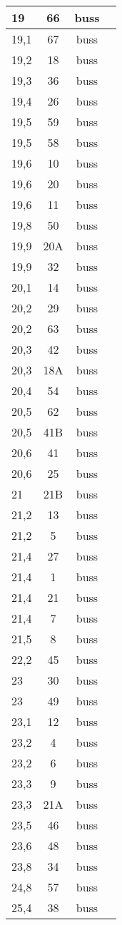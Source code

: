 \begin{longtable}{|l|c|c|c|}
19	&	66	&	buss	\\ \hline
19,1	&	67	&	buss	\\ \hline
19,2	&	18	&	buss	\\ \hline
19,3	&	36	&	buss	\\ \hline
19,4	&	26	&	buss	\\ \hline
19,5	&	59	&	buss	\\ \hline
19,5	&	58	&	buss	\\ \hline
19,6	&	10	&	buss	\\ \hline
19,6	&	20	&	buss	\\ \hline
19,6	&	11	&	buss	\\ \hline
19,8	&	50	&	buss	\\ \hline
19,9	&	20A	&	buss	\\ \hline
19,9	&	32	&	buss	\\ \hline
20,1	&	14	&	buss	\\ \hline
20,2	&	29	&	buss	\\ \hline
20,2	&	63	&	buss	\\ \hline
20,3	&	42	&	buss	\\ \hline
20,3	&	18A	&	buss	\\ \hline
20,4	&	54	&	buss	\\ \hline
20,5	&	62	&	buss	\\ \hline
20,5	&	41B	&	buss	\\ \hline
20,6	&	41	&	buss	\\ \hline
20,6	&	25	&	buss	\\ \hline
21	&	21B	&	buss	\\ \hline
21,2	&	13	&	buss	\\ \hline
21,2	&	5	&	buss	\\ \hline
21,4	&	27	&	buss	\\ \hline
21,4	&	1	&	buss	\\ \hline
21,4	&	21	&	buss	\\ \hline
21,4	&	7	&	buss	\\ \hline
21,5	&	8	&	buss	\\ \hline
22,2	&	45	&	buss	\\ \hline
23	&	30	&	buss	\\ \hline
23	&	49	&	buss	\\ \hline
23,1	&	12	&	buss	\\ \hline
23,2	&	4	&	buss	\\ \hline
23,2	&	6	&	buss	\\ \hline
23,3	&	9	&	buss	\\ \hline
23,3	&	21A	&	buss	\\ \hline
23,5	&	46	&	buss	\\ \hline
23,6	&	48	&	buss	\\ \hline
23,8	&	34	&	buss	\\ \hline
24,8	&	57	&	buss	\\ \hline
25,4	&	38	&	buss	\\ \hline
\end{longtable} 
